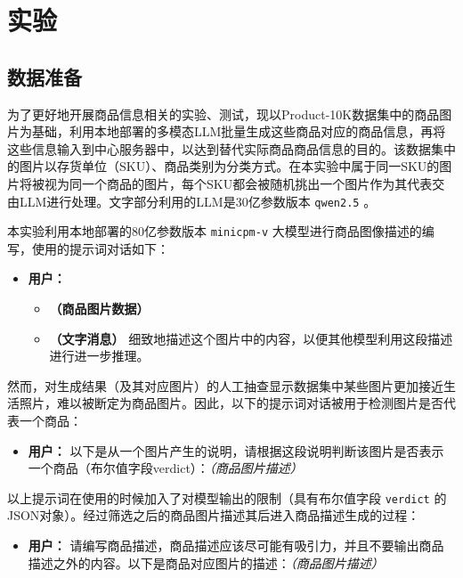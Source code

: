 \newpage
\section{实验}
\label{sec:experiment}

\subsection{数据准备}
为了更好地开展商品信息相关的实验、测试，现以Product-10K数据集\cite{bai2020products10k}中的商品图片为基础，利用本地部署的多模态LLM批量生成这些商品对应的商品信息，再将这些信息输入到中心服务器中，以达到替代实际商品商品信息的目的。该数据集中的图片以存货单位（SKU）、商品类别为分类方式。在本实验中属于同一SKU的图片将被视为同一个商品的图片，每个SKU都会被随机挑出一个图片作为其代表交由LLM进行处理。文字部分利用的LLM是30亿参数版本 \verb|qwen2.5| 。

本实验利用本地部署的80亿参数版本 \verb|minicpm-v| 大模型进行商品图像描述的编写，使用的提示词对话如下：

\begin{itemize}
    \item[] \textbf{用户：}
    \begin{itemize}
        \item[] \textbf{（商品图片数据）}
        \item[] \textbf{（文字消息）} 细致地描述这个图片中的内容，以便其他模型利用这段描述进行进一步推理。
    \end{itemize}
\end{itemize}

然而，对生成结果（及其对应图片）的人工抽查显示数据集中某些图片更加接近生活照片，难以被断定为商品图片。因此，以下的提示词对话被用于检测图片是否代表一个商品：

\begin{itemize}
    \item[] \textbf{用户：} 以下是从一个图片产生的说明，请根据这段说明判断该图片是否表示一个商品（布尔值字段verdict）：\textit{（商品图片描述）}
\end{itemize}

以上提示词在使用的时候加入了对模型输出的限制（具有布尔值字段 \verb|verdict| 的JSON对象）。经过筛选之后的商品图片描述其后进入商品描述生成的过程：

\begin{itemize}
    \item[] \textbf{用户：} 请编写商品描述，商品描述应该尽可能有吸引力，并且不要输出商品描述之外的内容。以下是商品对应图片的描述：\textit{（商品图片描述）}
\end{itemize}


